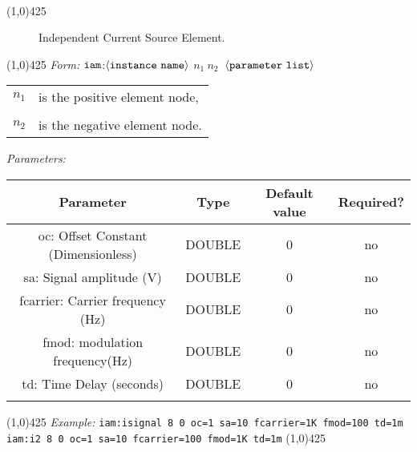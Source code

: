 \documentclass{article}
\begin{document}
\\
\hrulefill\linethickness{0.5mm}\line(1,0){425}
\normalsize
\newline
\begin{figure}[h]
\centerline{\epsfxsize=0.5in}
\caption{Independent Current Source Element.}
\end{figure}
\newline
\linethickness{0.5mm}\line(1,0){425}
\newline
\textit{Form:}
$\tt iam$:$\langle\tt{instance\ name}\rangle$ $n_1\
n_2\ $ $\langle \tt{parameter\ list}\rangle$
\newline
\begin{tabular}{r l}
$n_1$ & is the positive element node, \\
&  \\
$n_2$ & is the negative element node. \\
\end{tabular}
\newline
\textit{Parameters:}
\begin{table}[H]
\begin{tabular}{|c|c|c|c|}
\hline
Parameter&Type&Default value&Required?\\
\hline
oc: Offset Constant (Dimensionless)&DOUBLE&0&no\\
\hline
sa: Signal amplitude (V) & DOUBLE & 0 & no\\
\hline
fcarrier: Carrier frequency (Hz) & DOUBLE & 0 & no\\
\hline
fmod: modulation frequency(Hz) & DOUBLE & 0 & no\\
\hline
td: Time Delay (seconds) & DOUBLE & 0 & no\\
\par
\hline
\end{tabular}
\end{table}
\noindent\linethickness{0.5mm}\line(1,0){425}
\newline
\textit{Example:}
\newline
\texttt{iam:isignal\ 8\ 0\ oc=1 sa=10 fcarrier=1K fmod=100 td=1m}
\newline
\texttt{iam:i2\ 8\ 0\ oc=1 sa=10 fcarrier=100 fmod=1K td=1m}
\newline
\linethickness{0.5mm} \line(1,0){425}
\end{document}
